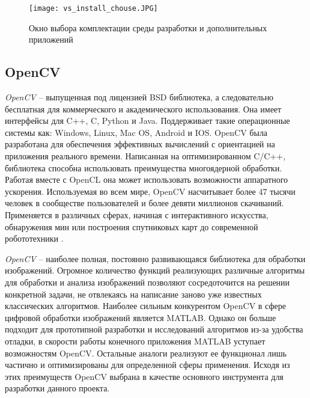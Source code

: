 \begin{figure}
    \centering   
    \texttt{[image: vs\_install\_chouse.JPG]} 
    \caption{Окно выбора комплектации среды разработки и дополнительных приложений }
    \label{fig:vs_install_chouse}
\end{figure} 

\begin{comment}
\begin{figure}
    \centering   
    \texttt{[image: vs\_install2.JPG]} 
    \caption{Процесс скачивания и установки Visual Studio}
    \label{fig:vs_install_progress}
\end{figure} 
\end{comment}
\subsection{OpenCV}
\label{sub:env_description:opencv}
\textit{OpenCV} -- выпущенная под лицензией BSD библиотека, а следовательно бесплатная для коммерческого и академического использования. Она имеет интерфейсы для C++, C, Python и Java. Поддерживает такие операционные системы как: Windows, Linux, Mac OS, Android и IOS. OpenCV была разработана для обеспечения эффективных вычислений с ориентацией на приложения реального времени. Написанная на оптимизированном C/C++, библиотека способна использовать преимущества многоядерной обработки. Работая вместе с OpenCL она может использовать возможности аппаратного ускорения. Используемая во всем мире, OpenCV насчитывает более 47 тысячи человек в сообществе пользователей и более девяти миллионов скачиваний. Применяется в различных сферах, начиная с интерактивного искусства, обнаружения мин или построения спутниковых карт до современной робототехники \cite{opencv_offical}.

\textit{OpenCV} -- наиболее полная, постоянно развивающаяся библиотека для обработки изображений. Огромное количество функций реализующих различные алгоритмы для обработки и анализа изображений позволяют сосредоточится на решении конкретной задачи, не отвлекаясь на написание заново уже известных классических алгоритмов. Наиболее сильным конкурентом OpenCV в сфере цифровой обработки изображений является MATLAB. Однако он больше подходит для прототипной разработки и исследований алгоритмов из-за удобства отладки, в скорости работы конечного приложения MATLAB уступает возможностям OpenCV. Остальные аналоги реализуют ее функционал лишь частично и оптимизированы для определенной сферы применения. Исходя из этих преимуществ OpenCV выбрана в качестве основного инструмента для разработки данного проекта.

